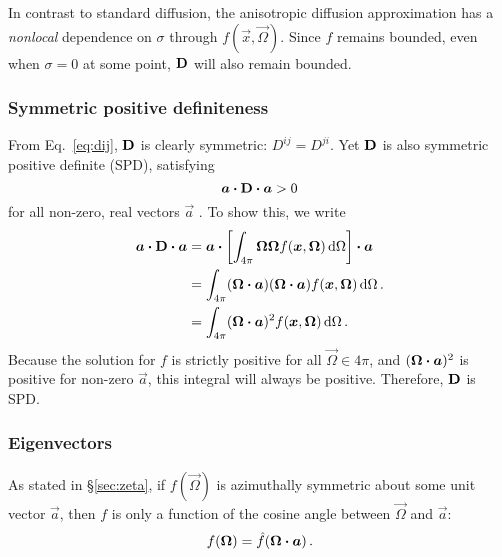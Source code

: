 In contrast to standard diffusion, the anisotropic diffusion approximation has
a \emph{nonlocal} dependence on $\sigma$ through $f(\vec{x}, \vec{\Omega})$. Since $f$ remains
bounded, even when $\sigma=0$ at some point, $\mathbf{D}$ will also remain bounded.

\subsubsection{Symmetric positive definiteness}
From Eq.~\eqref{eq:dij}, $\mathbf{D}$ is clearly symmetric: $D^{ij}=D^{ji}$. Yet
$\mathbf{D}$ is also symmetric positive definite (SPD), satisfying
\begin{equation*}
  \bm{a} \bm{\cdot} \mathbf{D} \bm{\cdot} \bm{a} > 0
\end{equation*}
for all non-zero, real vectors $\vec{a}$ \cite{Tre1997}. To show this, we write 
\begin{align*}
  \bm{a} \bm{\cdot} \mathbf{D} \bm{\cdot} \bm{a} &=
  \bm{a} \bm{\cdot} \left[\int_{4\pi} \bm{\Omega} \bm{\Omega}
  f(\bm{x}, \bm{\Omega}) \mathop{}\!\mathrm{d}\Omega\right] \bm{\cdot} \bm{a}
  \\
  &=
  \int_{4\pi} (\bm{\Omega} \bm{\cdot}
  \bm{a}) (\bm{\Omega} \bm{\cdot} \bm{a})
  f(\bm{x}, \bm{\Omega}) \mathop{}\!\mathrm{d}\Omega\,.
  \\
  &=
  \int_{4\pi} (\bm{\Omega} \bm{\cdot} \bm{a})^2
  f(\bm{x}, \bm{\Omega}) \mathop{}\!\mathrm{d}\Omega\,.
\end{align*}
Because the solution for $f$ is strictly positive for all $\vec{\Omega}\in
4\pi$, and $(\bm{\Omega} \bm{\cdot} \bm{a})^2$ is positive for non-zero
$\vec{a}$, this integral will always be positive. Therefore, $\mathbf{D}$ is SPD.

\subsubsection{Eigenvectors}\label{sec:eigenvectors}
As stated in \S\ref{sec:zeta}, if $f(\vec{\Omega})$ is azimuthally
symmetric about some unit vector $\vec{a}$, then $f$ is only a function of the
cosine angle
between $\vec{\Omega}$ and $\vec{a}$:
\begin{equation*}
f(\bm{\Omega}) = \hat f( \bm{\Omega} \bm{\cdot} \bm{a})\,.
\end{equation*}

